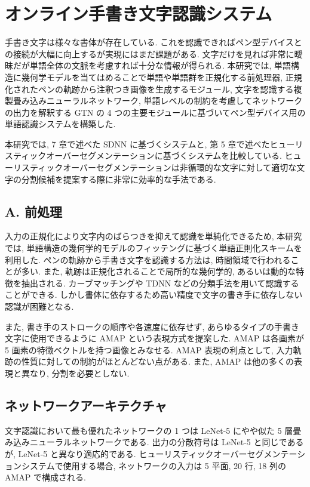 \documentclass[twocolumn]{jarticle}     %
\begin{document}
\section{オンライン手書き文字認識システム}
手書き文字は様々な書体が存在している. これを認識できればペン型デバイスとの接続が大幅に向上するが実現にはまだ課題がある. 
文字だけを見れば非常に曖昧だが単語全体の文脈を考慮すれば十分な情報が得られる. 
本研究では, 単語構造に幾何学モデルを当てはめることで単語や単語群を正規化する前処理器, 正規化されたペンの軌跡から注釈つき画像を生成するモジュール, 文字を認識する複製畳み込みニューラルネットワーク, 単語レベルの制約を考慮してネットワークの出力を解釈する GTN の 4 つの主要モジュールに基づいてペン型デバイス用の単語認識システムを構築した. 
\par
本研究では, 7 章で述べた SDNN に基づくシステムと, 第 5 章で述べたヒューリスティックオーバーセグメンテーションに基づくシステムを比較している. ヒューリスティックオーバーセグメンテーションは非循環的な文字に対して適切な文字の分割候補を提案する際に非常に効率的な手法である.

\subsection*{A. 前処理}
入力の正規化により文字内のばらつきを抑えて認識を単純化できるため, 本研究では, 単語構造の幾何学的モデルのフィッテングに基づく単語正則化スキームを利用した. 
ペンの軌跡から手書き文字を認識する方法は, 時間領域で行われることが多い. また, 軌跡は正規化されることで局所的な幾何学的, あるいは動的な特徴を抽出される. 
カーブマッチングや TDNN などの分類手法を用いて認識することができる. しかし書体に依存するため高い精度で文字の書き手に依存しない認識が困難となる. 
\par
また, 書き手のストロークの順序や各速度に依存せず, あらゆるタイプの手書き文字に使用できるように AMAP という表現方式を提案した. AMAP は各画素が 5 画素の特徴ベクトルを持つ画像とみなせる. AMAP 表現の利点として, 入力軌跡の性質に対しての制約がほとんどない点がある. また, AMAP は他の多くの表現と異なり, 分割を必要としない. 

\subsection*{ネットワークアーキテクチャ}
文字認識において最も優れたネットワークの 1 つは LeNet-5 にやや似た 5 層畳み込みニューラルネットワークである. 
出力の分散符号は LeNet-5 と同じであるが, LeNet-5 と異なり適応的である. ヒューリスティックオーバーセグメンテーションシステムで使用する場合, ネットワークの入力は 5 平面, 20 行, 18 列の AMAP で構成される. 
\end{document}
